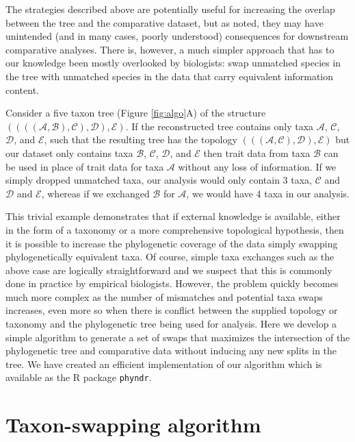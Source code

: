 \documentclass[a4paper,11pt]{article}
\newcommand{\phyndr}{\tt phyndr}
\begin{document}
The strategies described above are potentially useful for increasing the overlap between the tree and the comparative dataset, but as noted, they may have unintended (and in many cases, poorly understood) consequences for downstream comparative analyses. There is, however, a much simpler approach that has to our knowledge been mostly overlooked by biologists: swap unmatched species in the tree with unmatched species in the data that carry equivalent information content. 

Consider a five taxon tree (Figure \ref{fig:algo}A) of the structure $((((\mathcal{A},\mathcal{B}),\mathcal{C}),\mathcal{D}),\mathcal{E})$. If the reconstructed tree contains only taxa $\mathcal{A}$, $\mathcal{C}$, $\mathcal{D}$, and $\mathcal{E}$, such that the resulting tree has the topology $(((\mathcal{A},\mathcal{C}),\mathcal{D}),\mathcal{E})$ but our dataset only contains taxa $\mathcal{B}$, $\mathcal{C}$, $\mathcal{D}$, and $\mathcal{E}$  then trait data from taxa $\mathcal{B}$ can be used in place of trait data for taxa $\mathcal{A}$ without any loss of information. If we simply dropped unmatched taxa, our analysis would only contain 3 taxa, $\mathcal{C}$ and $\mathcal{D}$ and $\mathcal{E}$, whereas if we exchanged $\mathcal{B}$ for $\mathcal{A}$, we would have 4 taxa in our analysis.

This trivial example demonstrates that if external knowledge is available, either in the form of a taxonomy or a more comprehensive topological hypothesis, then it is possible to increase the phylogenetic coverage of the data simply swapping phylogenetically equivalent taxa. Of course, simple taxa exchanges such as the above case are logically straightforward and we suspect that this is commonly done in practice by empirical biologists. However, the problem quickly becomes much more complex as the number of mismatches and potential taxa swaps increases, even more so when there is conflict between the supplied topology or taxonomy and the phylogenetic tree being used for analysis. Here we develop a simple algorithm to generate a set of swaps that maximizes the intersection of the phylogenetic tree and comparative data without inducing any new splits in the tree. We have created an efficient implementation of our algorithm which is available as the R package {\phyndr}. 

\section{Taxon-swapping algorithm}
\end{document}
